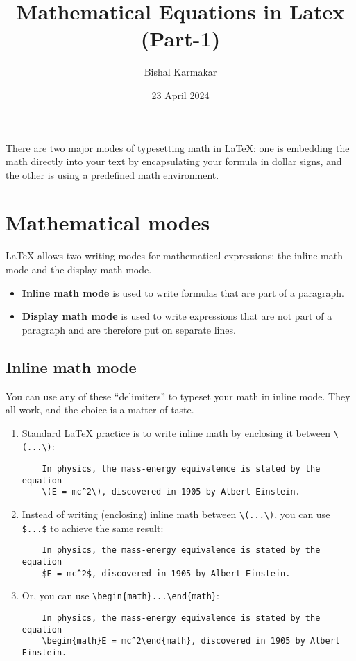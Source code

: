 \documentclass{article}
\title{Mathematical Equations in Latex \\ (Part-1)}
\author{Bishal Karmakar}
\date{23 April 2024}
\begin{document}
\maketitle

There are two major modes of typesetting math in LaTeX: one is embedding the math directly into your text by encapsulating your formula in dollar signs, and the other is using a predefined math environment.

\section{Mathematical modes}
LaTeX allows two writing modes for mathematical expressions: the inline math mode and the display math mode.
\begin{itemize}
    \item \textbf{Inline math mode} is used to write formulas that are part of a paragraph.
    \item \textbf{Display math mode} is used to write expressions that are not part of a paragraph and are therefore put on separate lines.
\end{itemize}

\subsection{Inline math mode}
You can use any of these “delimiters” to typeset your math in inline mode. They all work, and the choice is a matter of taste.
\begin{enumerate}
    \item Standard LaTeX practice is to write inline math by enclosing it between \verb|\(...\)|:
    \begin{verbatim}
    In physics, the mass-energy equivalence is stated by the equation
    \(E = mc^2\), discovered in 1905 by Albert Einstein.
    \end{verbatim}
    
    \item Instead of writing (enclosing) inline math between \verb|\(...\)|, you can use \verb|$...$| to achieve the same result:
    \begin{verbatim}
    In physics, the mass-energy equivalence is stated by the equation
    $E = mc^2$, discovered in 1905 by Albert Einstein.
    \end{verbatim}
    
    \item Or, you can use \verb|\begin{math}...\end{math}|:
    \begin{verbatim}
    In physics, the mass-energy equivalence is stated by the equation
    \begin{math}E = mc^2\end{math}, discovered in 1905 by Albert Einstein.
    \end{verbatim}
\end{enumerate}
\end{document}
